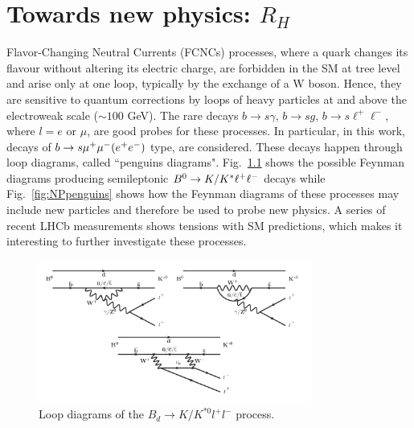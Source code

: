 \chapter{Towards new physics: $R_H$}
\label{sec:RKst_theory}

Flavor-Changing Neutral Currents (FCNCs) processes, where a quark changes its flavour without altering its 
electric charge, are forbidden in the SM at tree level and arise only at one loop, typically by the exchange 
of a W boson. Hence, they are sensitive to quantum corrections by loops of heavy particles at and above the 
electroweak scale ($\sim 100$ GeV). The rare decays $b \rightarrow s \gamma $, $b \rightarrow s g$, 
$b \rightarrow s \ell^+\ell^-$, where $l =  e \text{ or } \mu$, are good probes for these processes. 
In particular, in this work, decays of $b \rightarrow s{\mu^+\mu^-} (e^+ e^-)$ type, are considered. These decays happen 
through loop diagrams, called ``penguins diagrams". Fig.~\ref{fig:RKpenguins} shows the possible Feynman diagrams 
producing semileptonic ${{B}^0} \rightarrow K/{{K}^*}\ell^+\ell^-$ decays while Fig.~\ref{fig:NPpenguins} shows how the Feynman 
diagrams of these processes may include new particles and therefore be used to probe new physics. 
A series of recent LHCb measurements \cite{TomRDreview} shows tensions with SM predictions, which makes it
interesting to further investigate these processes.


\begin{figure}[h]
\centering \includegraphics[width=0.8\textwidth]{RKst/figs/penguins3.png}
\caption{Loop diagrams of the $B_d \rightarrow K/K^{*0}l^+l^-$ process.}
\label{fig:RKpenguins}
\end{figure}

